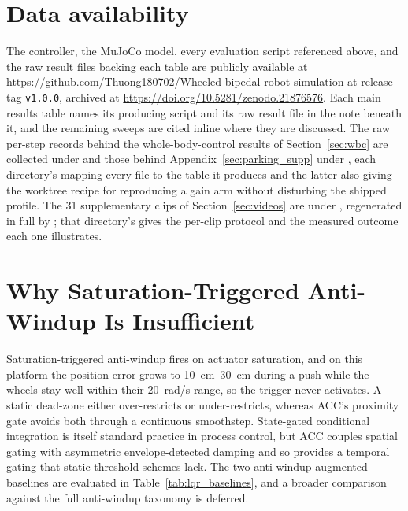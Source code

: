 \documentclass[a4paper,fleqn]{cas-dc}
\begin{document}
\section*{Data availability}
The controller, the MuJoCo model, every evaluation script referenced above, and
the raw result files backing each table are publicly available at
\url{https://github.com/Thuong180702/Wheeled-bipedal-robot-simulation} at
release tag \texttt{v1.0.0}, archived at
\url{https://doi.org/10.5281/zenodo.21876576}. Each main results table names its producing
script and its raw result file in the note beneath it, and the remaining sweeps
are cited inline where they are discussed. The raw per-step records behind the
whole-body-control results of Section~\ref{sec:wbc} are collected under
 and those behind
Appendix~\ref{sec:parking_supp} under ,
each directory's  mapping every file to the table it produces
and the latter also giving the worktree recipe for reproducing a gain arm
without disturbing the shipped profile. The \num{31} supplementary clips of
Section~\ref{sec:videos} are under , regenerated in full by
; that directory's  gives
the per-clip protocol and the measured outcome each one illustrates.

\appendix
\section{Why Saturation-Triggered Anti-Windup Is Insufficient}
\label{sec:aw_supp}

Saturation-triggered anti-windup fires on actuator saturation, and on this
platform the position error grows to \SIrange{10}{30}{cm} during a push while
the wheels stay well within their \SI{20}{rad/s} range, so the trigger never
activates. A static dead-zone either over-restricts or under-restricts, whereas
ACC's proximity gate avoids both through a continuous smoothstep. State-gated
conditional integration is itself standard practice in process control, but ACC
couples spatial gating with asymmetric envelope-detected damping and so provides
a temporal gating that static-threshold schemes lack. The two anti-windup
augmented baselines are evaluated in Table~\ref{tab:lqr_baselines}, and a
broader comparison against the full anti-windup taxonomy is deferred.
\end{document}
